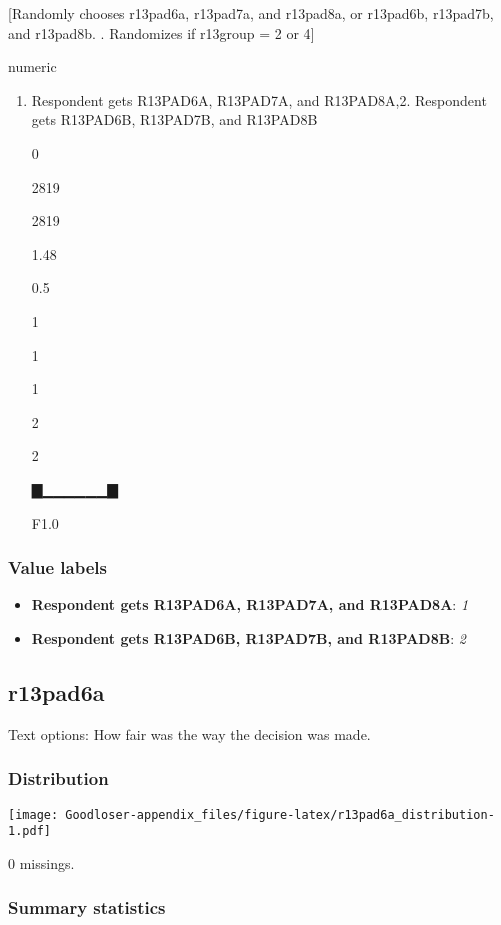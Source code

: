 \documentclass[]{book}
\providecommand{\tightlist}{%
  \setlength{\itemsep}{0pt}\setlength{\parskip}{0pt}}
\begin{document}
{[}Randomly chooses r13pad6a, r13pad7a, and r13pad8a, or r13pad6b,
r13pad7b, and r13pad8b. . Randomizes if r13group = 2 or 4{]}

numeric

\begin{enumerate}
\def\labelenumi{\arabic{enumi}.}
\tightlist
\item
  Respondent gets R13PAD6A, R13PAD7A, and R13PAD8A,2. Respondent gets
  R13PAD6B, R13PAD7B, and R13PAD8B

  0

  2819

  2819

  1.48

  0.5

  1

  1

  1

  2

  2

  ▇▁▁▁▁▁▁▇

  F1.0
\end{enumerate}

\subsubsection{Value labels}\label{r13pad6_ran_labels}

\begin{itemize}
\tightlist
\item
  \textbf{Respondent gets R13PAD6A, R13PAD7A, and R13PAD8A}: \emph{1}
\item
  \textbf{Respondent gets R13PAD6B, R13PAD7B, and R13PAD8B}: \emph{2}
\end{itemize}

\subsection{r13pad6a}\label{r13pad6a}

Text options: How fair was the way the decision was made.

\subsubsection{Distribution}\label{r13pad6a_distribution}

\texttt{[image: Goodloser-appendix\_files/figure-latex/r13pad6a\_distribution-1.pdf]}

0 missings.

\subsubsection{Summary statistics}\label{r13pad6a_summary}
\end{document}
